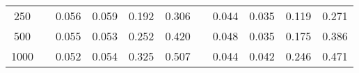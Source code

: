 % 
\begin{tabular}{ccccccccccc}
  \hline
  \hline
250 &  & 0.056 & 0.059 & 0.192 & 0.306 &  & 0.044 & 0.035 & 0.119 & 0.271 \\ 
  500 &  & 0.055 & 0.053 & 0.252 & 0.420 &  & 0.048 & 0.035 & 0.175 & 0.386 \\ 
  1000 &  & 0.052 & 0.054 & 0.325 & 0.507 &  & 0.044 & 0.042 & 0.246 & 0.471 \\ 
   \hline
\end{tabular}
